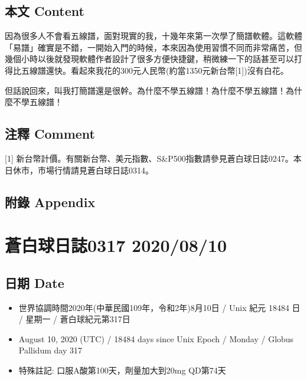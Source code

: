 \documentclass[a5paper, 11pt
]{book}
\providecommand{\tightlist}{%
  \setlength{\itemsep}{0pt}\setlength{\parskip}{0pt}}
\begin{document}
\hypertarget{ux672cux6587-content-69}{%
\subsection{本文 Content}\label{ux672cux6587-content-69}}

因為很多人不會看五線譜，面對現實的我，十幾年來第一次學了簡譜軟體。這軟體「易譜」確實是不錯，一開始入門的時候，本來因為使用習慣不同而非常痛苦，但幾個小時以後就發現軟體作者設計了很多方便快捷鍵，稍微練一下的話甚至可以打得比五線譜還快。看起來我花的300元人民幣(約當1350元新台幣{[}1{]})沒有白花。

但話說回來，叫我打簡譜還是很幹。為什麼不學五線譜！為什麼不學五線譜！為什麼不學五線譜！

\hypertarget{ux6ce8ux91cb-comment-69}{%
\subsection{注釋 Comment}\label{ux6ce8ux91cb-comment-69}}

{[}1{]}
新台幣計價。有關新台幣、美元指數、S\&P500指數請參見蒼白球日誌0247。本日休市，市場行情請見蒼白球日誌0314。

\hypertarget{ux9644ux9304-appendix-69}{%
\subsection{附錄 Appendix}\label{ux9644ux9304-appendix-69}}

\hypertarget{ux84bcux767dux7403ux65e5ux8a8c0317-20200810}{%
\section{蒼白球日誌0317
2020/08/10}\label{ux84bcux767dux7403ux65e5ux8a8c0317-20200810}}

\hypertarget{ux65e5ux671f-date-70}{%
\subsection{日期 Date}\label{ux65e5ux671f-date-70}}

\begin{itemize}
\tightlist
\item
  世界協調時間2020年(中華民國109年，令和2年)8月10日 / Unix 紀元 18484 日
  / 星期一 / 蒼白球紀元第317日
\item
  August 10, 2020 (UTC) / 18484 days since Unix Epoch / Monday / Globus
  Pallidum day 317
\item
  特殊註記: 口服A酸第100天，劑量加大到20mg QD第74天
\end{itemize}
\end{document}
